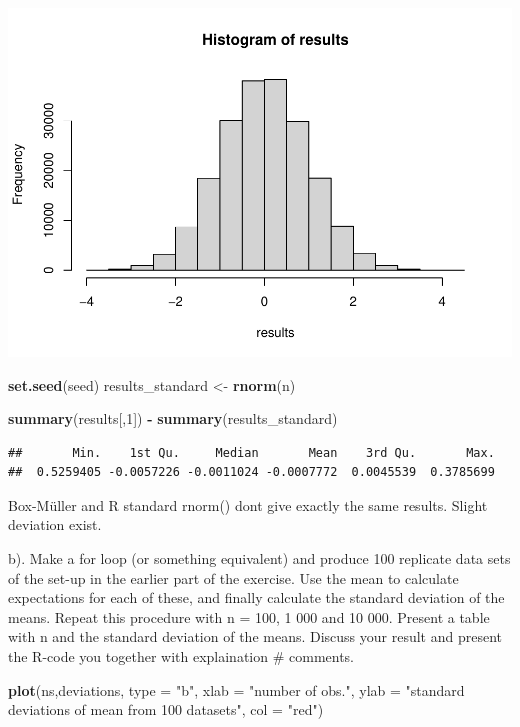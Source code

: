 \documentclass[
]{article}
\newenvironment{Shaded}{\begin{snugshade}}{\end{snugshade}}
\newcommand{\AttributeTok}[1]{\textcolor[rgb]{0.13,0.29,0.53}{#1}}
\newcommand{\DecValTok}[1]{\textcolor[rgb]{0.00,0.00,0.81}{#1}}
\newcommand{\FunctionTok}[1]{\textcolor[rgb]{0.13,0.29,0.53}{\textbf{#1}}}
\newcommand{\NormalTok}[1]{#1}
\newcommand{\OtherTok}[1]{\textcolor[rgb]{0.56,0.35,0.01}{#1}}
\newcommand{\SpecialCharTok}[1]{\textcolor[rgb]{0.81,0.36,0.00}{\textbf{#1}}}
\newcommand{\StringTok}[1]{\textcolor[rgb]{0.31,0.60,0.02}{#1}}
\begin{document}
\includegraphics{Aleksi_Patronen_lab1_files/figure-latex/cars-1.pdf}

\begin{Shaded}
\begin{Highlighting}[]
\FunctionTok{set.seed}\NormalTok{(seed)}
\NormalTok{results\_standard }\OtherTok{\textless{}{-}} \FunctionTok{rnorm}\NormalTok{(n)}

\FunctionTok{summary}\NormalTok{(results[,}\DecValTok{1}\NormalTok{]) }\SpecialCharTok{{-}} \FunctionTok{summary}\NormalTok{(results\_standard)}
\end{Highlighting}
\end{Shaded}

\begin{verbatim}
##       Min.    1st Qu.     Median       Mean    3rd Qu.       Max. 
##  0.5259405 -0.0057226 -0.0011024 -0.0007772  0.0045539  0.3785699
\end{verbatim}

Box-Müller and R standard rnorm() dont give exactly the same results.
Slight deviation exist.

b). Make a for loop (or something equivalent) and produce 100 replicate
data sets of the set-up in the earlier part of the exercise. Use the
mean to calculate expectations for each of these, and finally calculate
the standard deviation of the means. Repeat this procedure with n = 100,
1 000 and 10 000. Present a table with n and the standard deviation of
the means. Discuss your result and present the R-code you together with
explaination \# comments.

\begin{Shaded}
\begin{Highlighting}[]
\FunctionTok{plot}\NormalTok{(ns,deviations, }\AttributeTok{type =} \StringTok{"b"}\NormalTok{, }\AttributeTok{xlab =} \StringTok{"number of obs."}\NormalTok{, }\AttributeTok{ylab =} \StringTok{"standard deviations of mean from 100 datasets"}\NormalTok{, }\AttributeTok{col =} \StringTok{"red"}\NormalTok{)}
\end{Highlighting}
\end{Shaded}
\end{document}
